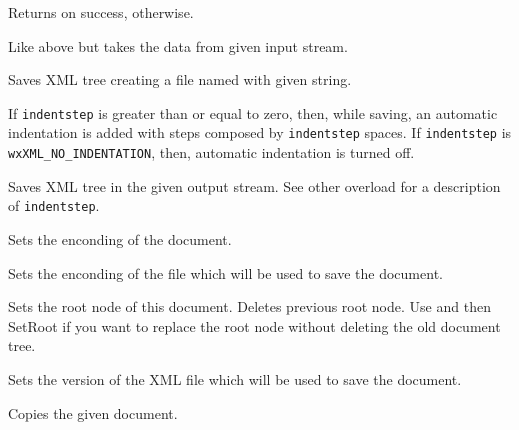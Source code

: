 Returns \true on success, \false otherwise.


Like above but takes the data from given input stream.

\label{wxxmldocumentsave}


Saves XML tree creating a file named with given string.

If {\tt indentstep} is greater than or equal to zero, then, while saving, an automatic indentation
is added with steps composed by {\tt indentstep} spaces.
If {\tt indentstep} is {\tt wxXML\_NO\_INDENTATION}, then, automatic indentation is turned off.


Saves XML tree in the given output stream. See other overload for a description of {\tt indentstep}.

\label{wxxmldocumentsetencoding}


Sets the enconding of the document.

\label{wxxmldocumentsetfileencoding}


Sets the enconding of the file which will be used to save the document.

\label{wxxmldocumentsetroot}


Sets the root node of this document. Deletes previous root node.
Use  and then SetRoot if you want to
replace the root node without deleting the old document tree.

\label{wxxmldocumentsetversion}


Sets the version of the XML file which will be used to save the document.

\label{wxxmldocumentoperatorassign}


Copies the given document.

